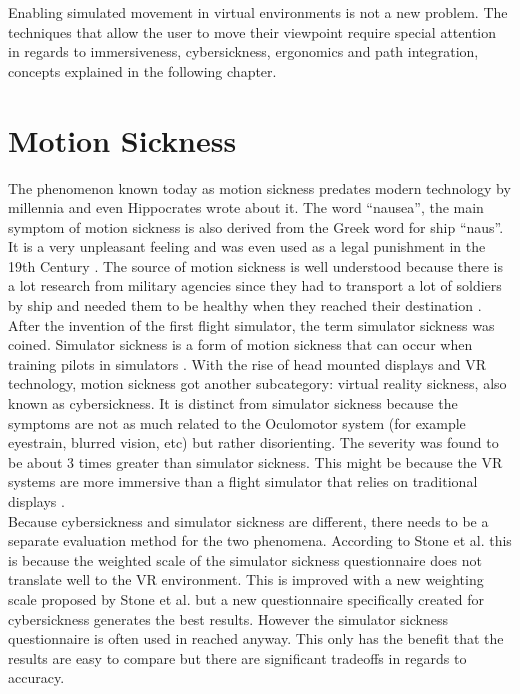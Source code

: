 Enabling simulated movement in virtual environments is not a new problem. 
The techniques that allow the user to move their viewpoint require special attention in regards to immersiveness, cybersickness, ergonomics and path integration, concepts explained in the following chapter.



\section{Motion Sickness}\label{motion-sickness}

The phenomenon known today as motion sickness predates modern technology
by millennia and even Hippocrates wrote about it. The word ``nausea'',
the main symptom of motion sickness is also derived from the Greek word
for ship ``naus''. \cite{Golding} It is a very
unpleasant feeling and was even used as a legal punishment in the 19th
Century \cite{Reason}. The source of motion sickness is
well understood because there is a lot research from military agencies
since they had to transport a lot of soldiers by ship and needed them to
be healthy when they reached their destination
\cite{Johnson}. After the invention of the first flight
simulator, the term simulator sickness was coined. Simulator sickness is
a form of motion sickness that can occur when training pilots in
simulators \cite{Johnson}. With the rise of head mounted
displays and VR technology, motion sickness got another subcategory:
virtual reality sickness, also known as cybersickness. It is distinct
from simulator sickness because the symptoms are not as much related to
the Oculomotor system (for example eyestrain, blurred vision, etc) but
rather disorienting. The severity was found to be about 3 times greater
than simulator sickness. This might be because the VR systems are more
immersive than a flight simulator that relies on traditional displays
\cite{Stanney}.\\Because cybersickness and simulator
sickness are different, there needs to be a separate evaluation method
for the two phenomena. According to Stone et al. \cite{Stone} this is because the
weighted scale of the simulator sickness questionnaire does not
translate well to the VR environment. This is improved with a new
weighting scale proposed by Stone et al. \cite{Stone} but a new questionnaire
specifically created for cybersickness generates the best results.
However the simulator sickness questionnaire is often used in reached
anyway. This only has the benefit that the results are easy to compare
but there are significant tradeoffs in regards to accuracy.


